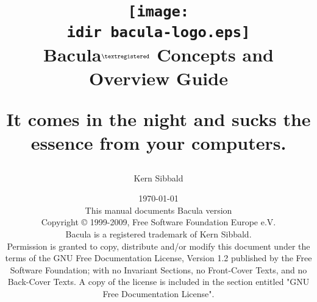 \parskip 10pt
\parindent 0pt

\title{\texttt{[image: \\idir bacula-logo.eps]} \\ \bigskip
  \Huge{Bacula}$^{\normalsize \textregistered}$ \Huge{Concepts and Overview Guide}
  \begin{center}
   \large{It comes in the night and sucks 
          the essence from your computers. }
  \end{center}
}


\author{Kern Sibbald}
\date{\vspace{1.0in}\today \\
      This manual documents Bacula version \fullversion \\
      \vspace{0.2in}
      Copyright {\copyright} 1999-2009, Free Software Foundation Europe
      e.V. \\
      Bacula {\textregistered}  is a registered trademark of Kern Sibbald.\\
      \vspace{0.2in}
  Permission is granted to copy, distribute and/or modify this document under the terms of the
  GNU Free Documentation License, Version 1.2 published by the Free Software Foundation; 
  with no Invariant Sections, no Front-Cover Texts, and no Back-Cover Texts.
  A copy of the license is included in the section entitled "GNU Free Documentation License".
}

\maketitle
